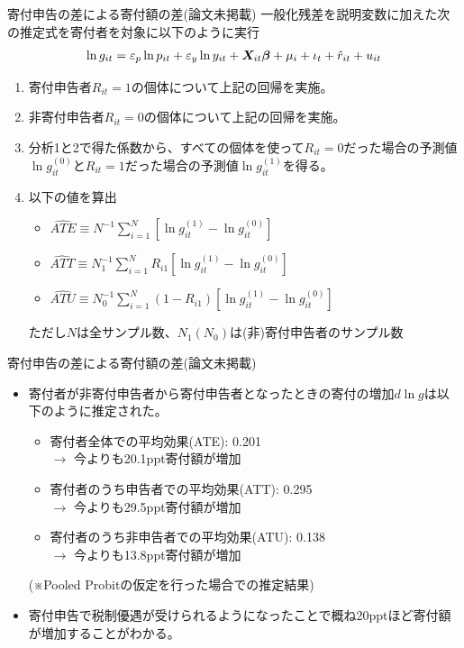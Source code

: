 \documentclass[dvipdfmx,10pt]{beamer}
\begin{document}
\begin{frame}{寄付申告の差による寄付額の差(論文未掲載)}
一般化残差を説明変数に加えた次の推定式を寄付者を対象に以下のように実行
		\begin{align}
			\ln g_{it} = \varepsilon_p\ln p_{it}+\varepsilon_y \ln y_{it} + \bm{X}_{it}\bm{\beta} + \mu_i + \iota_t + \hat{r}_{it}+u_{it}\notag
		\end{align}
		\begin{enumerate}
			\item 寄付申告者$R_{it}=1$の個体について上記の回帰を実施。
			\item 非寄付申告者$R_{it}=0$の個体について上記の回帰を実施。
			\item 分析1と2で得た係数から、すべての個体を使って$R_{it}=0$だった場合の予測値$\ln g_{it}^{(0)}$と$R_{it}=1$だった場合の予測値$\ln g_{it}^{(1)}$を得る。
			\item 以下の値を算出
			\begin{itemize}
				\item $\hat{ATE}\equiv N^{-1}\sum_{i=1}^N[\ln g_{it}^{(1)}-\ln g_{it}^{(0)}]$
				\item $\hat{ATT}\equiv N_1^{-1}\sum_{i=1}^NR_{i1}[\ln g_{it}^{(1)}-\ln g_{it}^{(0)}]$
				\item $\hat{ATU}\equiv N_0^{-1}\sum_{i=1}^N(1-R_{i1})[\ln g_{it}^{(1)}-\ln g_{it}^{(0)}]$
			\end{itemize}
			ただし$N$は全サンプル数、$N_1(N_0)$は(非)寄付申告者のサンプル数
		\end{enumerate}
	\end{frame}

\begin{frame}{寄付申告の差による寄付額の差(論文未掲載)}
	\begin{itemize}
		\item 寄付者が非寄付申告者から寄付申告者となったときの寄付の増加$d \ln g$は以下のように推定された。
		\begin{itemize}
			\item 寄付者全体での平均効果(ATE): 0.201\\
			$\to$ 今よりも20.1ppt寄付額が増加
			\item 寄付者のうち申告者での平均効果(ATT): 0.295\\
			$\to$ 今よりも29.5ppt寄付額が増加
			\item 寄付者のうち非申告者での平均効果(ATU): 0.138\\
			$\to$ 今よりも13.8ppt寄付額が増加
		\end{itemize}
		(※Pooled Probitの仮定を行った場合での推定結果)
		\item 寄付申告で税制優遇が受けられるようになったことで概ね20pptほど寄付額が増加することがわかる。
	\end{itemize}
\end{frame}
\end{document}
